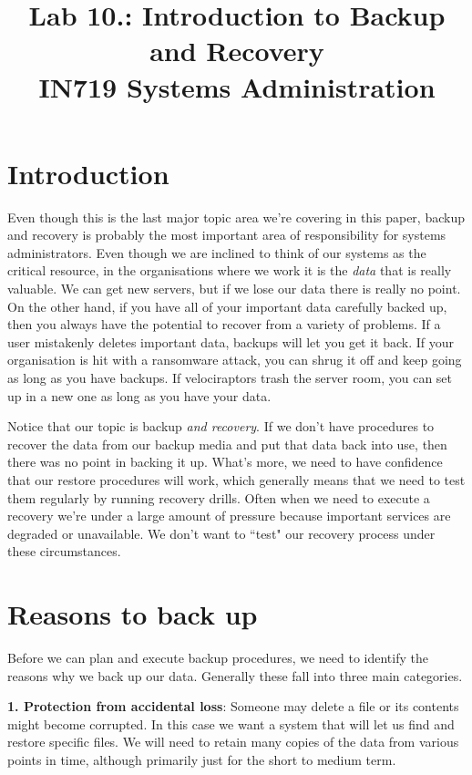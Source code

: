 \documentclass{article}   	%
\title{Lab 10.: Introduction to Backup and Recovery\\ IN719 Systems Administration}
\date{}							%
\begin{document}
\maketitle

\section*{Introduction}
Even though this is the last major topic area we're covering in this paper, backup and recovery is probably the most important area of responsibility for systems administrators. Even though we are inclined to think of our systems as the critical resource, in the organisations where we work it is the \emph{data} that is really valuable. We can get new servers, but if we lose our data there is really no point. On the other hand, if you have all of your important data carefully backed up, then you always have the potential to recover from a variety of problems.  If a user mistakenly deletes important data, backups will let you get it back. If your organisation is hit with a ransomware attack, you can shrug it off and keep going as long as you have backups. If velociraptors trash the server room, you can set up in a new one as long as you have your data.

Notice that our topic is backup \emph{and recovery}. If we don't have procedures to recover the data from our backup media and put that data back into use, then there was no point in backing it up. What's more, we need to have confidence that our restore procedures will work, which generally means that we need to test them regularly by running recovery drills. Often when we need to execute a recovery we're under a large amount of pressure because important services are degraded or unavailable. We don't want to ``test" our recovery process under these circumstances.

\section{Reasons to back up}
Before we can plan and execute backup procedures, we need to identify the reasons why we back up our data. Generally these fall into three main categories.

\textbf{1. Protection from accidental loss}: Someone may delete a file or its contents might become corrupted. In this case we want a system that will let us find and restore specific files. We will need to retain many copies of the data from various points in time, although primarily just for the short to medium term. 
\end{document}
